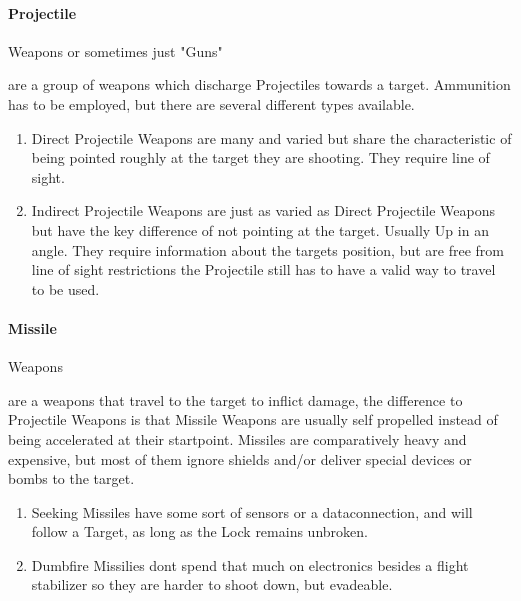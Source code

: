         \paragraph{Projectile} Weapons or sometimes just "Guns" \par are a group of weapons which discharge Projectiles
        towards a target.
        Ammunition has to be employed, but there are several different types available.
        \begin{enumerate}[label= -]
            \item{Direct} Projectile Weapons are many and varied but share the characteristic of being pointed roughly at
            the target they are shooting.
            They require line of sight.
            \item{Indirect} Projectile Weapons are just as varied as Direct Projectile Weapons but have the key difference
            of not pointing at the target.
            Usually Up in an angle.
            They require information about the targets position,
            but are free from line of sight restrictions the Projectile still has to have a valid way to travel to be used.
        \end{enumerate}
        \paragraph{Missile} Weapons \par are a weapons that travel to the target to inflict damage, the difference
        to Projectile Weapons is that Missile Weapons are usually self propelled instead of being accelerated at their
        startpoint.
        Missiles are comparatively heavy and expensive, but most of them ignore shields and/or deliver
        special devices or bombs to the target.
        \begin{enumerate}[label= -]
            \item{Seeking} Missiles have some sort of sensors or a dataconnection, and will follow a Target, as long as the Lock
            remains unbroken.
            \item{Dumbfire} Missilies dont spend that much on electronics besides a flight stabilizer so they are
            harder to shoot down, but evadeable.
        \end{enumerate}
